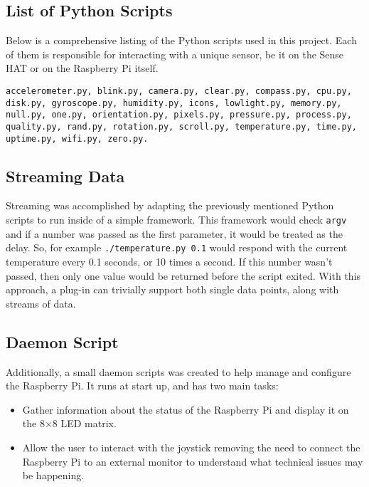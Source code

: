 \subsection{List of Python Scripts}

Below is a comprehensive listing of the Python scripts used in this project. Each of them is responsible for interacting with a unique sensor, be it on the Sense HAT or on the Raspberry Pi itself.\\

\begin{lstlisting}[caption={List of Python scripts}, label={lst:sensor-scripts}]
accelerometer.py, blink.py, camera.py, clear.py, compass.py, cpu.py, disk.py, gyroscope.py, humidity.py, icons, lowlight.py, memory.py, null.py, one.py, orientation.py, pixels.py, pressure.py, process.py, quality.py, rand.py, rotation.py, scroll.py, temperature.py, time.py, uptime.py, wifi.py, zero.py.
\end{lstlisting}

\subsection{Streaming Data}

Streaming was accomplished by adapting the previously mentioned Python scripts to run inside of a simple framework. This framework would check \lstinline{argv} and if a number was passed as the first parameter, it would be treated as the delay. So, for example \lstinline{./temperature.py 0.1} would respond with the current temperature every 0.1 seconds, or 10 times a second. If this number wasn't passed, then only one value would be returned before the script exited. With this approach, a plug-in can trivially support both single data points, along with streams of data.

\subsection{Daemon Script}

Additionally, a small daemon scripts was created to help manage and configure the Raspberry Pi. It runs at start up, and has two main tasks:

\begin{itemize}
\item Gather information about the status of the Raspberry Pi and display it on the 8$\times$8 LED matrix.
\item Allow the user to interact with the joystick removing the need to connect the Raspberry Pi to an external monitor to understand what technical issues may be happening.
\end{itemize}

